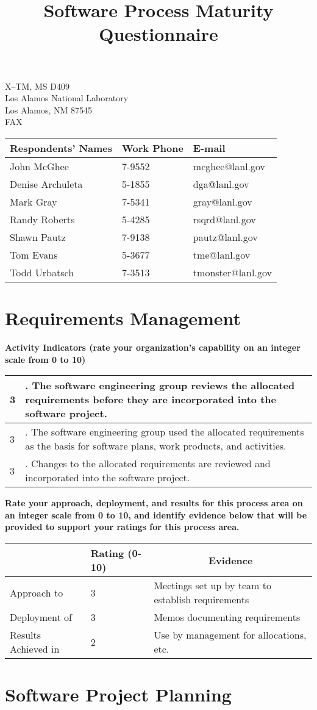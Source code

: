 \documentclass{article}
\title{Software Process Maturity Questionnaire}
\newcommand{\KPAname}{}
\newenvironment{KPARate}[1]
	{\renewcommand{\KPAname}{#1}
	 {\bf Rate your approach, deployment, and results for
	  this process area on an integer scale from 0 to 10, and 
	  identify evidence below that will be provided to support your
	  ratings for this process area.}
	 \begin{center}
	 \begin{tabular}{|p{1.0in}|p{0.5in}|p{5.0in}|} \hline
	 & Rating (0-10) & \multicolumn{1}{c|}{Evidence} \\ \hline}
	{\end{tabular}
	 \end{center}}
\newcommand{\Approach}[2]{Approach to \KPAname & #1 & #2 \\ \hline}
\newcommand{\Deployment}[2]{Deployment of \KPAname & #1 & #2 \\ \hline}
\newcommand{\Results}[2]{Results Achieved in \KPAname & #1 & #2 \\
	\hline}
\newcounter{activity}
\newenvironment{KPAActivity}
	{
	 \setcounter{activity}{0}
	 {\bf Activity Indicators (rate your organization's capability
	 on an integer scale from 0 to 10)}
	 \begin{center}
	 \begin{tabular}{|p{0.5in}|p{6.0in}|} \hline
	}
	{
	 \end{tabular}
	 \end{center}
	}
\newcommand{\Activity}[2]{\stepcounter{activity} #1 &
\arabic{activity}. #2 \\ \hline}
\begin{document}
\maketitle
\begin{center}
\parbox{35ex}{X--TM, MS D409\\
Los Alamos National Laboratory\\
Los Alamos, NM 87545\\
FAX \\}

\begin{tabular}{|l|l|l|} \hline
 {\bf Respondents' Names} & {\bf Work Phone} & {\bf E-mail} \\ \hline
John McGhee & 7-9552 & mcghee@lanl.gov \\
Denise Archuleta & 5-1855 & dga@lanl.gov \\
Mark Gray & 7-5341 & gray@lanl.gov \\
Randy Roberts & 5-4285 & rsqrd@lanl.gov \\
Shawn Pautz & 7-9138 &pautz@lanl.gov \\
Tom Evans & 5-3677 & tme@lanl.gov \\
Todd Urbatsch & 7-3513 & tmonster@lanl.gov \\ \hline
\end{tabular}
\end{center}
\newpage
\section{Requirements Management}

\begin{KPAActivity}
\Activity{3}{The software engineering group reviews the allocated
requirements before they are incorporated into the software project.}
\Activity{3}{The software engineering group used the allocated
requirements as the basis for software plans, work products, and
activities.}
\Activity{3}{Changes to the allocated requirements are reviewed and
incorporated into the software project.}
\end{KPAActivity}

\begin{KPARate}{Requirements Management}
\Approach{3}{Meetings set up by team to establish requirements}
\Deployment{3}{Memos documenting requirements}
\Results{2}{Use by management for allocations, etc.}
\end{KPARate}

\newpage
\section{Software Project Planning}
\end{document}
